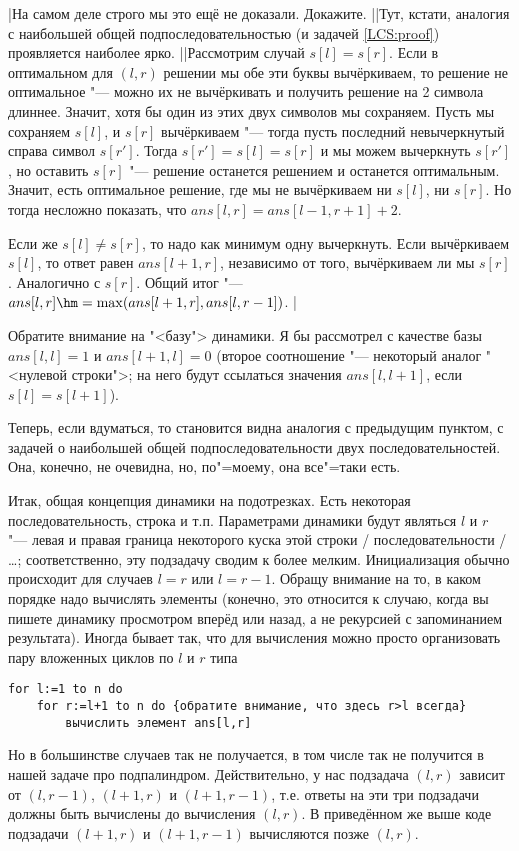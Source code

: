 \task|На самом деле строго мы это ещё не доказали. Докажите.
||Тут, кстати, аналогия с наибольшей общей подпоследовательностью (и задачей \ref{LCS:proof}) проявляется наиболее ярко.
||Рассмотрим случай $s[l]=s[r]$. Если в оптимальном для $(l,r)$ решении мы обе эти буквы 
вычёркиваем, то решение не оптимальное "--- можно их не вычёркивать и получить решение на 2 символа 
длиннее. Значит, хотя бы один из этих двух символов мы сохраняем. Пусть мы сохраняем $s[l]$, и 
$s[r]$ вычёркиваем "--- тогда пусть последний невычеркнутый справа символ $s[r']$. Тогда $s[r']=s[l]=s[r]$ 
и мы можем вычеркнуть $s[r']$, но оставить $s[r]$ "--- решение останется решением и останется 
оптимальным. Значит, есть оптимальное решение, где мы не вычёркиваем ни $s[l]$, ни $s[r]$. Но тогда 
несложно показать, что $ans[l,r]=ans[l-1,r+1]+2$.

Если же $s[l]\neq s[r]$, то надо как минимум одну вычеркнуть. Если вычёркиваем $s[l]$, то ответ 
равен $ans[l+1,r]$, независимо от того, вычёркиваем ли мы $s[r]$. Аналогично с $s[r]$. Общий итог 
"--- $ans[l,r]\hm=\max(ans[l+1,r],ans[l,r-1])$.
|

Обратите внимание на "<базу"> динамики. Я бы рассмотрел с качестве базы $ans[l,l]=1$ и 
$ans[l+1,l]=0$ (второе соотношение "--- некоторый аналог "<нулевой строки">; на него будут 
ссылаться значения $ans[l,l+1]$, если $s[l]=s[l+1]$).

Теперь, если вдуматься, то становится видна аналогия с предыдущим пунктом, с задачей о наибольшей общей подпоследовательности двух последовательностей. Она, конечно, не очевидна, но, по"=моему, она все"=таки есть. 

Итак, общая концепция динамики на подотрезках. Есть некоторая последовательность, строка и т.п. Параметрами динамики будут являться $l$ и $r$ "--- левая и правая граница некоторого куска этой строки / последовательности / \dots{}; соответственно, эту подзадачу сводим к более мелким. Инициализация обычно происходит для случаев $l=r$ или $l=r-1$. Обращу внимание на то, в каком порядке надо вычислять элементы (конечно, это относится к случаю, когда вы пишете динамику просмотром вперёд или назад, а не рекурсией с запоминанием результата). Иногда бывает так, что для вычисления можно просто организовать пару вложенных циклов по $l$ и $r$ типа
\begin{codesampleo}\begin{verbatim}
for l:=1 to n do
    for r:=l+1 to n do {обратите внимание, что здесь r>l всегда}
        вычислить элемент ans[l,r]
\end{verbatim}
\end{codesampleo}
Но в большинстве случаев так не получается, в том числе так не получится в нашей задаче про подпалиндром. Действительно, у нас подзадача $(l,r)$ зависит от $(l,r-1)$,  $(l+1,r)$ и $(l+1,r-1)$, т.е. ответы на эти три подзадачи должны быть вычислены до вычисления $(l,r)$. В приведённом же выше коде подзадачи $(l+1,r)$ и $(l+1,r-1)$ вычисляются позже $(l,r)$. 

